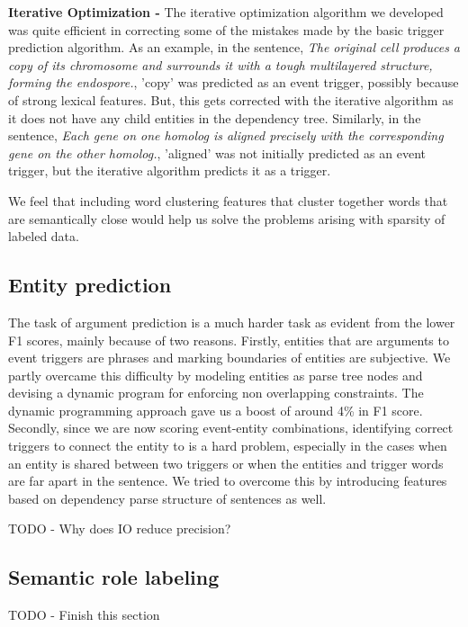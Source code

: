 {\bf Iterative Optimization -} The iterative optimization algorithm we developed was quite efficient in correcting some of the mistakes made by the basic trigger prediction algorithm. As an example, in the sentence, {\em The original cell produces a copy of its chromosome and surrounds it with a tough multilayered structure, forming the endospore.}, 'copy' was predicted as an event trigger, possibly because of strong lexical features. But, this gets corrected with the iterative algorithm as it does not have any child entities in the dependency tree. Similarly, in the sentence, {\em Each gene on one homolog is aligned precisely with the corresponding gene on the other homolog.}, 'aligned' was not initially predicted as an event trigger, but the iterative algorithm predicts it as a trigger.

We feel that including word clustering features that cluster together words that are semantically close would help us solve the problems arising with sparsity of labeled data.

\subsection{Entity prediction}
The task of argument prediction is a much harder task as evident from the lower F1 scores, mainly because of two reasons. Firstly, entities that are arguments to event triggers are phrases and marking boundaries of entities are subjective. We partly overcame this difficulty by modeling entities as parse tree nodes and devising a dynamic program for enforcing non overlapping constraints. The dynamic programming approach gave us a boost of around 4\% in F1 score. Secondly, since we are now scoring event-entity combinations, identifying correct triggers to connect the entity to is a hard problem, especially in the cases when an entity is shared between two triggers or when the entities and trigger words are far apart in the sentence. We tried to overcome this by introducing features based on dependency parse structure of sentences as well.

TODO - Why does IO reduce precision?

\subsection{Semantic role labeling}

TODO - Finish this section